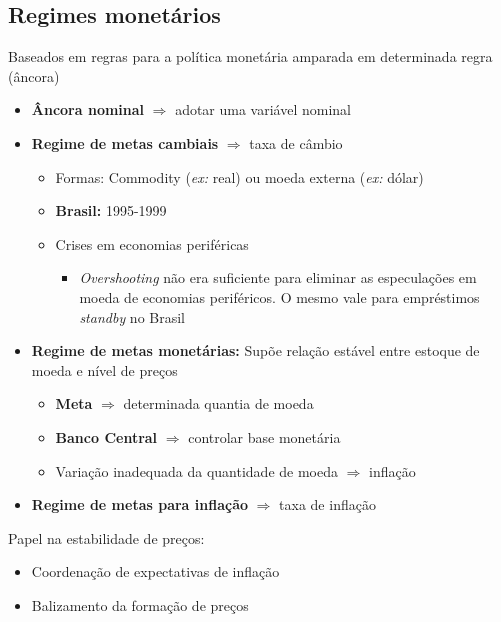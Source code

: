 \documentclass[11pt]{article}
\begin{document}
\subsection*{Regimes monetários}
\label{sec:orga611347}

Baseados em regras para a política monetária amparada em determinada regra (âncora)

\begin{itemize}
\item \textbf{Âncora nominal} \(\Rightarrow\) adotar uma variável nominal
\item \textbf{Regime de metas cambiais} \(\Rightarrow\) taxa de câmbio
\begin{itemize}
\item Formas: Commodity (\emph{ex:} real) ou moeda externa (\emph{ex:} dólar)
\item \textbf{Brasil:} 1995-1999
\item Crises em economias periféricas
\begin{itemize}
\item \emph{Overshooting} não era suficiente para eliminar as especulações em moeda de economias periféricos. O mesmo vale para empréstimos \emph{standby} no Brasil
\end{itemize}
\end{itemize}
\item \textbf{Regime de metas monetárias:} Supõe relação estável entre estoque de moeda e nível de preços
\begin{itemize}
\item \textbf{Meta} \(\Rightarrow\) determinada quantia de moeda
\item \textbf{Banco Central} \(\Rightarrow\) controlar base monetária
\item Variação inadequada da quantidade de moeda \(\Rightarrow\) inflação
\end{itemize}
\item \textbf{Regime de metas para inflação} \(\Rightarrow\) taxa de inflação
\end{itemize}

Papel na estabilidade de preços:

\begin{itemize}
\item Coordenação de expectativas de inflação
\item Balizamento da formação de preços
\end{itemize}
\end{document}
